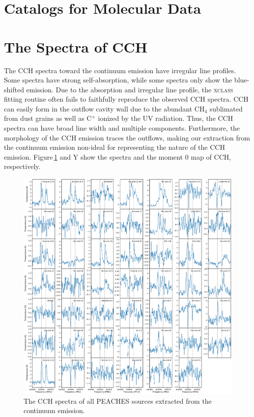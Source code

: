 \documentclass[twocolumn]{aastex62}
\begin{document}


\appendix
\section{Catalogs for Molecular Data}
\label{sec:catalogs}

\section{The Spectra of CCH}
The CCH spectra toward the continuum emission have irregular line profiles.  Some spectra have strong self-absorption, while some spectra only show the blue-shifted emission.  Due to the absorption and irregular line profile, the \textsc{xclass} fitting routine often fails to faithfully reproduce the observed CCH spectra.  CCH can easily form in the outflow cavity wall due to the abundant CH$_{4}$ sublimated from dust grains as well as C$^+$ ionized by the UV radiation.  Thus, the CCH spectra can have broad line width and multiple components.  Furthermore, the morphology of the CCH emission traces the outflows, making our extraction from the continuum emission non-ideal for representing the nature of the CCH emission.  Figure\,\ref{fig:all_cch} and Y show the spectra and the moment 0 map of CCH, respectively.

\begin{figure}[htbp!]
  \centering
  \includegraphics[width=\textwidth]{all_cch.pdf}
  \caption{The CCH spectra of all PEACHES sources extracted from the continuum emission.}
  \label{fig:all_cch}
\end{figure}


\end{document}
